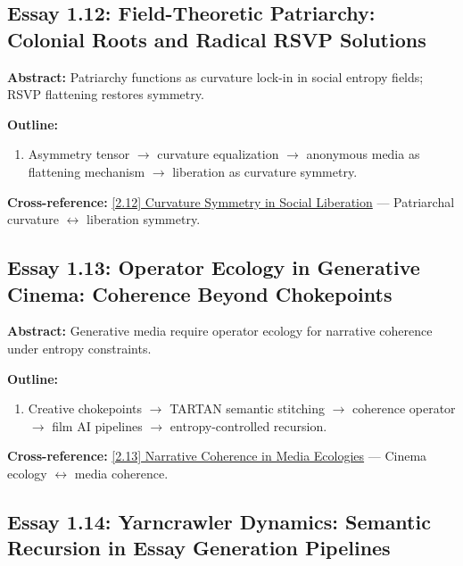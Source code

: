 \documentclass[12pt,a4paper]{article}
\begin{document}
\subsection{Essay 1.12: Field-Theoretic Patriarchy: Colonial Roots and Radical RSVP Solutions}
\label{sec:essay1-12}

\textbf{Abstract:} Patriarchy functions as curvature lock-in in social entropy fields; RSVP flattening restores symmetry.

\textbf{Outline:}
\begin{enumerate}
\item Asymmetry tensor  $\to$ curvature equalization $\to$ anonymous media as flattening mechanism $\to$ liberation as curvature symmetry.
\end{enumerate}

\textbf{Cross-reference:} \hyperref[sec:essay2-12]{[2.12] Curvature Symmetry in Social Liberation} --- Patriarchal curvature $\leftrightarrow$ liberation symmetry.

\subsection{Essay 1.13: Operator Ecology in Generative Cinema: Coherence Beyond Chokepoints}
\label{sec:essay1-13}

\textbf{Abstract:} Generative media require operator ecology for narrative coherence under entropy constraints.

\textbf{Outline:}
\begin{enumerate}
\item Creative chokepoints $\to$ TARTAN semantic stitching $\to$ coherence operator  $\to$ film AI pipelines $\to$ entropy-controlled recursion.
\end{enumerate}

\textbf{Cross-reference:} \hyperref[sec:essay2-13]{[2.13] Narrative Coherence in Media Ecologies} --- Cinema ecology $\leftrightarrow$ media coherence.

\subsection{Essay 1.14: Yarncrawler Dynamics: Semantic Recursion in Essay Generation Pipelines}
\label{sec:essay1-14}
\end{document}
